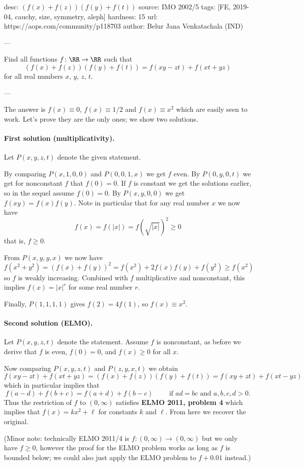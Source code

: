 desc: $(f(x)+f(z))(f(y)+f(t))$
source: IMO 2002/5
tags: [FE, 2019-04, cauchy, size, symmetry, aleph]
hardness: 15
url: https://aops.com/community/p118703
author: Belur Jana Venkatachala (IND)

---

Find all functions $f \colon \RR \to \RR$ such that
\[ \left(f(x)+f(z)\right)\left(f(y)+f(t)\right)
  = f(xy-zt)+f(xt+yz) \]
for all real numbers $x$, $y$, $z$, $t$.

---

The answer is $f(x) \equiv 0$, $f(x) \equiv 1/2$
and $f(x) \equiv x^2$ which are easily seen to work.
Let's prove they are the only ones;
we show two solutions.

\paragraph{First solution (multiplicativity).}
Let $P(x,y,z,t)$ denote the given statement.
\begin{itemize}
  \ii By comparing $P(x,1,0,0)$ and $P(0,0,1,x)$
  we get $\boxed{f \text{ even}}$.
  \ii By $P(0,y,0,t)$ we get for nonconstant $f$
  that $f(0) = 0$.
  If $f$ is constant we get the solutions earlier,
  so in the sequel assume $\boxed{f(0) = 0}$.
  \ii By $P(x,y,0,0)$ we get $\boxed{f(xy) = f(x) f(y)}$.
  Note in particular that for any real number $x$ we now have
  \[ f(x) = f(|x|) = f\left( \sqrt{|x|} \right)^2 \ge 0 \]
  that is, $f \ge 0$.
\end{itemize}

From $P(x,y,y,x)$ we now have
\[ f(x^2 + y^2) = \left( f(x) + f(y) \right)^2
  = f(x^2) + 2f(x)f(y) + f(y^2) \ge f(x^2) \]
so $f$ is weakly increasing.
Combined with $f$ multiplicative and nonconstant,
this implies $f(x) = |x|^r$ for some real number $r$.

Finally, $P(1,1,1,1)$ gives $f(2) = 4f(1)$,
so $f(x) \equiv x^2$.

\paragraph{Second solution (ELMO).}
Let $P(x,y,z,t)$ denote the statement.
Assume $f$ is nonconstant,
as before we derive that $f$ is even, $f(0) = 0$,
and $f(x) \ge 0$ for all $x$.

Now comparing $P(x,y,z,t)$ and $P(z,y,x,t)$ we obtain
\[ f(xy-zt) + f(xt+yz) =
  \left( f(x)+f(z) \right)
  \left( f(y)+f(t) \right)
  = f(xy+zt) + f(xt-yz) \]
which in particular implies that
\[ f(a-d) + f(b+c) = f(a+d) + f(b-c)
\qquad \text{ if } ad=bc \text{ and } a,b,c,d > 0. \]
Thus the restriction of $f$ to $(0,\infty)$ satisfies
\textbf{ELMO 2011, problem 4}
which implies that $f(x) = kx^2+\ell$ for constants $k$ and $\ell$.
From here we recover the original.

(Minor note: technically ELMO 2011/4 is $f \colon (0,\infty) \to (0,\infty)$
but we only have $f \ge 0$,
however the proof for the ELMO problem
works as long as $f$ is bounded below;
we could also just apply the ELMO problem to $f+0.01$ instead.)
